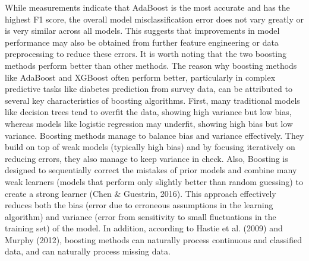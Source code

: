 \documentclass[12pt]{article}
\begin{document}
While measurements indicate that AdaBoost is the most accurate and has the highest F1 score, the overall model misclassification error does not vary greatly or is very similar across all models. This suggests that improvements in model performance may also be obtained from further feature engineering or data preprocessing to reduce these errors. It is worth noting that the two boosting methods perform better than other methods. The reason why boosting methods like AdaBoost and XGBoost often perform better, particularly in complex predictive tasks like diabetes prediction from survey data, can be attributed to several key characteristics of boosting algorithms. First, many traditional models like decision trees tend to overfit the data, showing high variance but low bias, whereas models like logistic regression may underfit, showing high bias but low variance. Boosting methods manage to balance bias and variance effectively. They build on top of weak models (typically high bias) and by focusing iteratively on reducing errors, they also manage to keep variance in check. Also, Boosting is designed to sequentially correct the mistakes of prior models and combine many weak learners (models that perform only slightly better than random guessing) to create a strong learner (Chen \& Guestrin, 2016). This approach effectively reduces both the bias (error due to erroneous assumptions in the learning algorithm) and variance (error from sensitivity to small fluctuations in the training set) of the model. In addition, according to Hastie et al. (2009) and Murphy (2012), boosting methods can naturally process continuous and classified data, and can naturally process missing data. 
\end{document}
